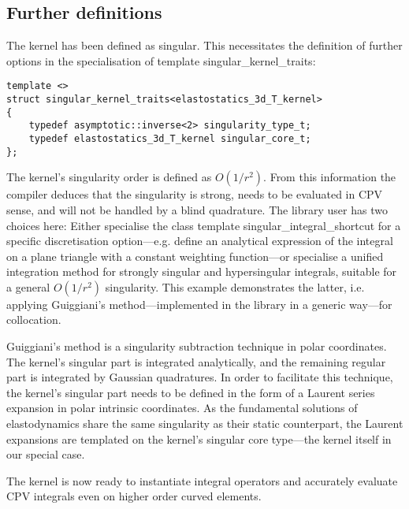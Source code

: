 \documentclass{article}
\begin{document}
\subsection{Further definitions}

The kernel has been defined as singular.
This necessitates the definition of further options in the specialisation of template singular\_kernel\_traits:
%
\begin{lstlisting}
template <>
struct singular_kernel_traits<elastostatics_3d_T_kernel>
{
	typedef asymptotic::inverse<2> singularity_type_t;
	typedef elastostatics_3d_T_kernel singular_core_t;
};
\end{lstlisting}
%
The kernel's singularity order is defined as $O(1/r^2)$.
From this information the compiler deduces that the singularity is strong, needs to be evaluated in CPV sense, and will not be handled by a blind quadrature.
The library user has two choices here: Either specialise the class template singular\_integral\_shortcut for a specific discretisation option---e.g. define an analytical expression of the integral on a plane triangle with a constant weighting function---or specialise a unified integration method for strongly singular and hypersingular integrals, suitable for a general $O(1/r^2)$ singularity.
This example demonstrates the latter, i.e. applying Guiggiani's method---implemented in the library in a generic way---for collocation.

Guiggiani's method is a singularity subtraction technique in polar coordinates.
The kernel's singular part is integrated analytically, and the remaining regular part is integrated by Gaussian quadratures.
In order to facilitate this technique, the kernel's singular part needs to be defined in the form of a Laurent series expansion in polar intrinsic coordinates.
As the fundamental solutions of elastodynamics share the same singularity as their static counterpart, the Laurent expansions are templated on the kernel's singular core type---the kernel itself in our special case.

%
The kernel is now ready to instantiate integral operators and accurately evaluate CPV integrals even on higher order curved elements.
\end{document}
